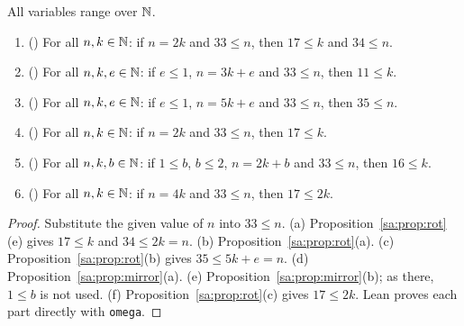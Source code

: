 \begin{proposition}\label{sa:prop:assembled}
All variables range over $\mathbb N$.
\begin{enumerate}[label=(\alph*)]
\item \textup{(}\textup{)} For all $n,k\in\mathbb N$: if $n=2k$ and $33\le n$, then $17\le k$ and
  $34\le n$.
\item \textup{(}\textup{)} For all $n,k,e\in\mathbb N$: if $e\le1$, $n=3k+e$ and $33\le n$, then
  $11\le k$.
\item \textup{(}\textup{)} For all $n,k,e\in\mathbb N$: if $e\le1$, $n=5k+e$ and $33\le n$, then
  $35\le n$.
\item \textup{(}\textup{)} For all $n,k\in\mathbb N$: if $n=2k$ and $33\le n$, then $17\le k$.
\item \textup{(}\textup{)} For all $n,k,b\in\mathbb N$: if $1\le b$, $b\le2$, $n=2k+b$ and $33\le n$, then
  $16\le k$.
\item \textup{(}\textup{)} For all $n,k\in\mathbb N$: if $n=4k$ and $33\le n$, then
  $17\le2k$.
\end{enumerate}
\end{proposition}

\begin{proof}
Substitute the given value of $n$ into $33\le n$. (a) Proposition~\ref{sa:prop:rot}(e) gives $17\le k$ and
$34\le2k=n$. (b) Proposition~\ref{sa:prop:rot}(a). (c) Proposition~\ref{sa:prop:rot}(b) gives $35\le5k+e=n$.
(d) Proposition~\ref{sa:prop:mirror}(a). (e) Proposition~\ref{sa:prop:mirror}(b); as there, $1\le b$ is not used.
(f) Proposition~\ref{sa:prop:rot}(c) gives $17\le2k$. Lean proves each part directly with \texttt{omega}.
\end{proof}

